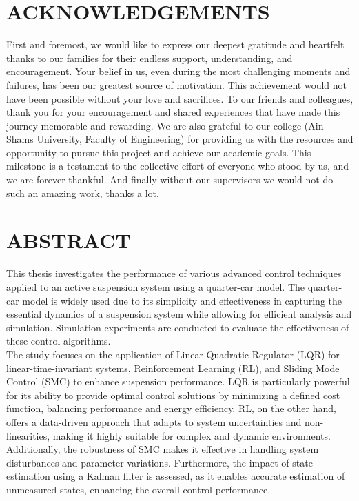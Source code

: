\chapter*{ACKNOWLEDGEMENTS}
First and foremost, we would like to express our deepest gratitude and heartfelt thanks to our families for their endless  support, understanding, and encouragement. Your belief in us, even during the most challenging moments and failures, has been our greatest source of motivation. This achievement would not have been possible without your love and sacrifices. To our friends and colleagues, thank you for your encouragement and shared experiences that have made this journey memorable and rewarding. We are also grateful to our college (Ain Shams University, Faculty of Engineering) for providing us with the resources and opportunity to pursue this project and achieve our academic goals. This milestone is a testament to the collective effort of everyone who stood by us, and we are forever thankful. And finally without our supervisors we would not do such an amazing work, thanks a lot.

\chapter*{ABSTRACT}
This thesis investigates the performance of various advanced control techniques applied to an active suspension system using a quarter-car model. The quarter-car model is widely used due to its simplicity and effectiveness in capturing the essential dynamics of a suspension system while allowing for efficient analysis and simulation. Simulation experiments are conducted to evaluate the effectiveness of these control algorithms.\\

The study focuses on the application of Linear Quadratic Regulator (LQR) for linear-time-invariant systems, Reinforcement Learning (RL), and Sliding Mode Control (SMC) to enhance suspension performance. LQR is particularly powerful for its ability to provide optimal control solutions by minimizing a defined cost function, balancing performance and energy efficiency. RL, on the other hand, offers a data-driven approach that adapts to system uncertainties and non-linearities, making it highly suitable for complex and dynamic environments. Additionally, the robustness of SMC makes it effective in handling system disturbances and parameter variations. Furthermore, the impact of state estimation using a Kalman filter is assessed, as it enables accurate estimation of unmeasured states, enhancing the overall control performance.\\

